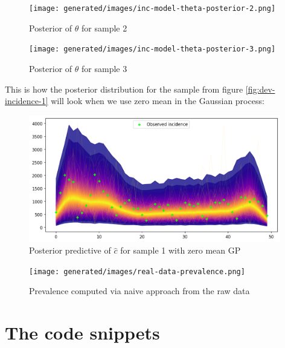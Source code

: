 \documentclass[
  digital, %
  oneside, %
  lof,     %
  lot,     %
]{fithesis4}
\begin{document}
\begin{figure}[H]
  \begin{center}
    \texttt{[image: generated/images/inc-model-theta-posterior-2.png]}
  \end{center}
  \caption{Posterior of $\theta$ for sample 2}
  \label{fig:theta-posterior-2}
\end{figure}

\begin{figure}[H]
  \begin{center}
    \texttt{[image: generated/images/inc-model-theta-posterior-3.png]}
  \end{center}
  \caption{Posterior of $\theta$ for sample 3}
  \label{fig:theta-posterior-3}
\end{figure}

\newpage
This is how the posterior distribution for the sample from figure \ref{fig:dev-incidence-1} will look when we use zero mean in the Gaussian process:

\begin{figure}[H]
  \centering
  \includegraphics[width=11cm]{static/images/inc-model-ppc-plot-1-zero-mean.png}
  \caption{Posterior predictive of $\hat{c}$ for sample 1 with zero mean GP}
  \label{fig:incidence-posterior-1-zero-mean}
\end{figure}



\begin{figure}[H]
  \begin{center}
    \texttt{[image: generated/images/real-data-prevalence.png]}
  \end{center}
  \caption{Prevalence computed via naive approach from the raw data}
  \label{fig:real-data-prevalence}
\end{figure}



\chapter{The code snippets}
\end{document}
